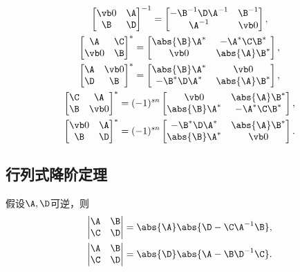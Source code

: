 \begin{gather*}
\begin{bmatrix}
		\vb0 & \A \\
		\B & \D
	\end{bmatrix}^{-1}
	= \begin{bmatrix}
		-\B^{-1}\D\A^{-1} & \B^{-1} \\
		\A^{-1} & \vb0
	\end{bmatrix}, \\
	\begin{bmatrix}
		\A & \C \\
		\vb0 & \B
	\end{bmatrix}^*
	= \begin{bmatrix}
		\abs{\B} \A^* & -\A^*\C\B^* \\
		\vb0 & \abs{\A} \B^*
	\end{bmatrix}, \\
	\begin{bmatrix}
		\A & \vb0 \\
		\D & \B
	\end{bmatrix}^*
	= \begin{bmatrix}
		\abs{\B} \A^* & \vb0 \\
		-\B^* \D \A^* & \abs{\A} \B^*
	\end{bmatrix}, \\
	\begin{bmatrix}
		\C & \A \\
		\B & \vb0
	\end{bmatrix}^*
	= (-1)^{sn} \begin{bmatrix}
		\vb0 & \abs{\A} \B^* \\
		\abs{\B} \A^* & -\A^*\C\B^*
	\end{bmatrix}, \\
	\begin{bmatrix}
		\vb0 & \A \\
		\B & \D
	\end{bmatrix}^*
	= (-1)^{sn} \begin{bmatrix}
		-\B^*\D\A^* & \abs{\A} \B^* \\
		\abs{\B} \A^* & \vb0
	\end{bmatrix}.
\end{gather*}

\subsection*{行列式降阶定理}
假设\(\A,\D\)可逆，则\begin{gather*}
	\begin{vmatrix}
		\A & \B \\
		\C & \D
	\end{vmatrix}
	= \abs{\A} \abs{\D - \C \A^{-1} \B}, \\ %
	\begin{vmatrix}
		\A & \B \\
		\C & \D
	\end{vmatrix}
	= \abs{\D} \abs{\A - \B \D^{-1} \C}. %
\end{gather*}
